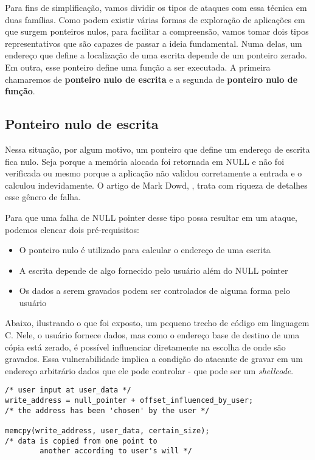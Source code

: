 	
		Para fins de simplificação, vamos dividir os tipos de ataques com essa técnica em duas famílias.
		Como podem existir várias formas de exploração de aplicações em que surgem ponteiros nulos,
		para facilitar a compreensão, vamos tomar dois tipos representativos que são capazes de passar
		a ideia fundamental.
		Numa delas, um endereço que define a localização de uma escrita depende de um ponteiro zerado.
		Em outra, esse ponteiro define uma função a ser executada.
		A primeira chamaremos de \textbf{ponteiro nulo de escrita} e a segunda de \textbf{ponteiro nulo de função}.


		\subsection{Ponteiro nulo de escrita}
		\label{subsec:ponteiro_escrita}
			Nessa situação, por algum motivo, um ponteiro que define um endereço de escrita fica nulo.
			Seja porque a memória alocada foi retornada em NULL e não foi verificada ou mesmo porque
			a aplicação não validou corretamente a entrada e o calculou indevidamente.
			O artigo de Mark Dowd, \cite{Dowd2008}, trata com riqueza de detalhes esse gênero de falha.
			

			Para que uma falha de NULL pointer desse tipo possa resultar em um ataque,
			podemos elencar dois pré-requisitos:
			\begin{itemize}
				\item{O ponteiro nulo é utilizado para calcular o endereço de uma escrita}
				\item{A escrita depende de algo fornecido pelo usuário além do NULL pointer}
				\item{Os dados a serem gravados podem ser controlados de alguma forma pelo usuário}
			\end{itemize}
			Abaixo, ilustrando o que foi exposto, um pequeno trecho de código em linguagem C.
			Nele, o usuário fornece dados, mas como o endereço base de destino de uma cópia está zerado,
			é possível influenciar diretamente na escolha de onde são gravados.
			Essa vulnerabilidade implica a condição do atacante de gravar em um endereço arbitrário dados
			que ele pode controlar - que pode ser um \textsl{shellcode}.
			\begin{lstlisting}[label=write_to_address,caption=Ponteiro em C]
/* user input at user_data */
write_address = null_pointer + offset_influenced_by_user;
/* the address has been 'chosen' by the user */

memcpy(write_address, user_data, certain_size);
/* data is copied from one point to
		another according to user's will */
			\end{lstlisting}
			
